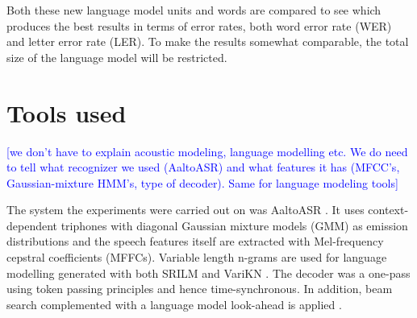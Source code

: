 \documentclass[10pt,b5paper,utf8]{article}
\newcommand{\note}[1]{{\textcolor{blue}{[#1]}}}
\begin{document}
Both these new language model units and words are compared to see which produces the best results in terms of error rates, both word error rate (WER) and letter error rate (LER). To make the results somewhat comparable, the total size of the language model will be restricted.

\section{Tools used}

\note{we don't have to explain acoustic modeling, language modelling etc. We do need to tell what recognizer we used (AaltoASR) and what features it has (MFCC's, Gaussian-mixture HMM's, type of decoder). Same for language modeling tools}


The system the experiments were carried out on was AaltoASR \cite{hirsimaki2009importance}\cite{pylkkonen2005efficient}. It uses context-dependent triphones with diagonal Gaussian mixture models (GMM) as emission distributions and the speech features itself are extracted with Mel-frequency cepstral coefficients (MFFCs). Variable length n-grams are used for language modelling generated with both SRILM and VariKN \cite{siivola2007growing}\cite{siivola2007morfessor}. The decoder was a one-pass using token passing principles and hence time-synchronous. In addition, beam search complemented with a language model look-ahead is applied \cite{ortmanns1997look}.
\end{document}
